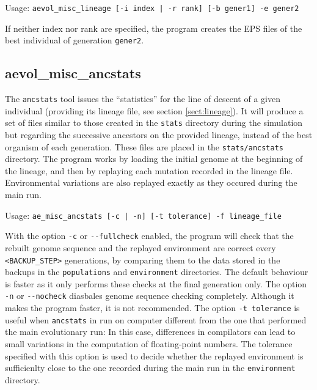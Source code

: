 Usage: \verb?aevol_misc_lineage [-i index | -r rank] [-b gener1] -e gener2?

If neither index nor rank are specified, the program creates the EPS files of the best individual of generation \verb?gener2?.


\subsection{aevol\_misc\_ancstats}
\label{sect:ancstats}
The \verb?ancstats? tool issues the ``statistics'' for the line of descent of a given individual (providing its lineage file, see section \ref{sect:lineage}). It will produce a set of files similar to those created in the \verb?stats? directory during the simulation but regarding the successive ancestors on the provided lineage, instead of the best organism of each generation. These files are placed in the \verb?stats/ancstats? directory. The program works by loading the initial genome at the beginning of the lineage, and then by replaying each mutation recorded in the lineage file. Environmental variations are also replayed exactly as they occured during the main run.

Usage: \verb?ae_misc_ancstats [-c | -n] [-t tolerance] -f lineage_file?

With the option \verb?-c? or \verb?--fullcheck? enabled, the program will check that the rebuilt genome sequence and the replayed environment are correct every \verb?<BACKUP_STEP>? generations, by comparing them to the data stored in the backups in the \verb?populations? and \verb?environment? directories. The default behaviour is faster as it only performs these checks at the final generation only. The option \verb?-n? or \verb?--nocheck? diasbales genome sequence checking completely. Although it makes the program faster, it is not recommended. The option \verb?-t tolerance? is useful when \verb?ancstats? in run on computer different from the one that performed the main evolutionary run: In this case, differences in compilators can lead to small variations in the computation of floating-point numbers. The tolerance specified with this option is used to decide whether the replayed environment is sufficienlty close to the one recorded during the main run in the \verb?environment? directory.




